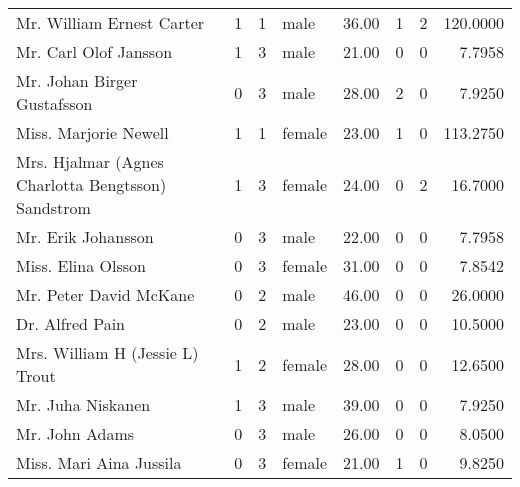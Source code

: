 \begin{tabular}{lrrlrrrr}
Mr. William Ernest Carter                          &         1 &       1 &    male &  36.00 &                        1 &                        2 &  120.0000 \\
Mr. Carl Olof Jansson                              &         1 &       3 &    male &  21.00 &                        0 &                        0 &    7.7958 \\
Mr. Johan Birger Gustafsson                        &         0 &       3 &    male &  28.00 &                        2 &                        0 &    7.9250 \\
Miss. Marjorie Newell                              &         1 &       1 &  female &  23.00 &                        1 &                        0 &  113.2750 \\
Mrs. Hjalmar (Agnes Charlotta Bengtsson) Sandstrom &         1 &       3 &  female &  24.00 &                        0 &                        2 &   16.7000 \\
Mr. Erik Johansson                                 &         0 &       3 &    male &  22.00 &                        0 &                        0 &    7.7958 \\
Miss. Elina Olsson                                 &         0 &       3 &  female &  31.00 &                        0 &                        0 &    7.8542 \\
Mr. Peter David McKane                             &         0 &       2 &    male &  46.00 &                        0 &                        0 &   26.0000 \\
Dr. Alfred Pain                                    &         0 &       2 &    male &  23.00 &                        0 &                        0 &   10.5000 \\
Mrs. William H (Jessie L) Trout                    &         1 &       2 &  female &  28.00 &                        0 &                        0 &   12.6500 \\
Mr. Juha Niskanen                                  &         1 &       3 &    male &  39.00 &                        0 &                        0 &    7.9250 \\
Mr. John Adams                                     &         0 &       3 &    male &  26.00 &                        0 &                        0 &    8.0500 \\
Miss. Mari Aina Jussila                            &         0 &       3 &  female &  21.00 &                        1 &                        0 &    9.8250 \\

\end{tabular}
